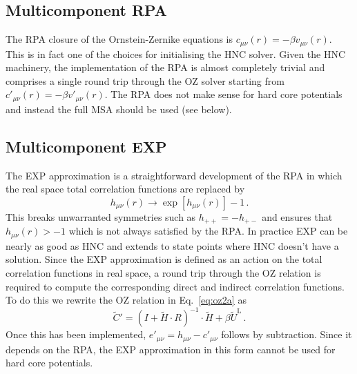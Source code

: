 \documentclass[12pt,a4paper]{article}
\newcommand{\lr}{^{\mathrm{L}}}
\newcommand{\Eqref}[1]{Eq.~\eqref{#1}}
\begin{document}
\subsection{Multicomponent RPA}\label{sec:RPA}
%
The RPA closure of the Ornstein-Zernike equations is
$c_{\mu\nu}(r)=-\beta v_{\mu\nu}(r)$.  This is in fact one of the
choices for initialising the HNC solver.  Given the HNC machinery, the
implementation of the RPA is almost completely trivial and comprises a
single round trip through the OZ solver starting from
$c'_{\mu\nu}(r)=-\beta v'_{\mu\nu}(r)$.  The RPA does not make sense
for hard core potentials and instead the full MSA should be used (see
below).

\subsection{Multicomponent EXP}\label{sec:EXP}
%
The EXP approximation is a straightforward development of the RPA in
which the real space total correlation functions are replaced by
%
\begin{equation}
h_{\mu\nu}(r)\to \exp[h_{\mu\nu}(r)]-1\,.\label{eq:exp}
\end{equation}
%
This breaks unwarranted symmetries such as $h_{++}=-h_{+-}$ and
ensures that $h_{\mu\nu}(r)>-1$ which is not always satisfied by the
RPA.  In practice EXP can be nearly as good as HNC and extends to
state points where HNC doesn't have a solution.  Since the EXP
approximation is defined as an action on the total correlation
functions in real space, a round trip through the OZ relation is
required to compute the corresponding direct and indirect correlation
functions.  To do this we rewrite the OZ relation in \Eqref{eq:oz2a} as
%
\begin{equation}
{\tilde C}' = (I+{\tilde H}\cdot R)^{-1}\cdot{\tilde H}
 + \beta{\tilde U}\lr\,.
\label{eq:ozndb}
\end{equation}
%
Once this has been implemented, $e'_{\mu\nu}= h_{\mu\nu} -
c'_{\mu\nu}$ follows by subtraction.  Since it depends on the RPA, the
EXP approximation in this form cannot be used for hard core
potentials.
\end{document}
